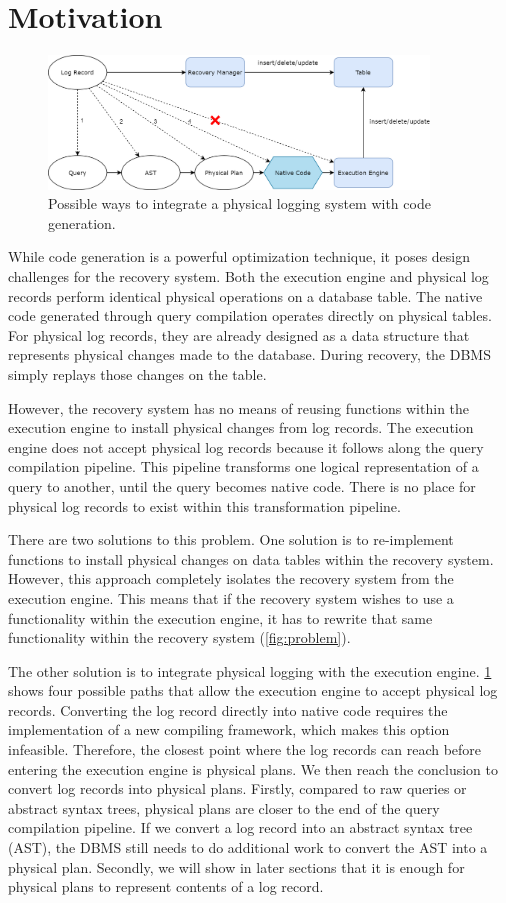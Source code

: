 \documentclass[12pt]{cmuthesis}
\begin{document}
\section{Motivation}
\begin{figure}[t!]
\centering
\includegraphics[width=0.9\textwidth]{images/Motivation.png}
\caption{Possible ways to integrate a physical logging system with code generation.}
\label{fig:motivation}
\end{figure}
While code generation is a powerful optimization technique, it poses design challenges for the recovery system. Both the execution engine and physical log records perform identical physical operations on a database table. The native code generated through query compilation operates directly on physical tables. For physical log records, they are already designed as a data structure that represents physical changes made to the database. During recovery, the DBMS simply replays those changes on the table.

However, the recovery system has no means of reusing functions within the execution engine to install physical changes from log records. The execution engine does not accept physical log records because it follows along the query compilation pipeline. This pipeline transforms one logical representation of a query to another, until the query becomes native code. There is no place for physical log records to exist within this transformation pipeline.

There are two solutions to this problem. One solution is to re-implement functions to install physical changes on data tables within the recovery system. However, this approach completely isolates the recovery system from the execution engine. This means that if the recovery system wishes to use a functionality within the execution engine, it has to rewrite that same functionality within the recovery system (\cref{fig:problem}).

The other solution is to integrate physical logging with the execution engine. \cref{fig:motivation} shows four possible paths that allow the execution engine to accept physical log records. Converting the log record directly into native code requires the implementation of a new compiling framework, which makes this option infeasible. Therefore, the closest point where the log records can reach before entering the execution engine is physical plans. We then reach the conclusion to convert log records into physical plans. Firstly, compared to raw queries or abstract syntax trees, physical plans are closer to the end of the query compilation pipeline. If we convert a log record into an abstract syntax tree (AST), the DBMS still needs to do additional work to convert the AST into a physical plan. Secondly, we will show in later sections that it is enough for physical plans to represent contents of a log record.
\end{document}
